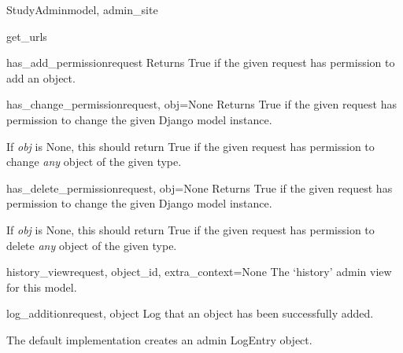 \documentclass[letterpaper,10pt,english]{sphinxmanual}
\begin{document}
\begin{classdesc}{StudyAdmin}{model, admin\_site}
\hypertarget{data.admin.StudyAdmin.get_urls}{}\begin{methoddesc}{get\_urls}{}\end{methoddesc}

\hypertarget{data.admin.StudyAdmin.has_add_permission}{}\begin{methoddesc}{has\_add\_permission}{request}
Returns True if the given request has permission to add an object.
\end{methoddesc}

\hypertarget{data.admin.StudyAdmin.has_change_permission}{}\begin{methoddesc}{has\_change\_permission}{request, obj=None}
Returns True if the given request has permission to change the given
Django model instance.

If \emph{obj} is None, this should return True if the given request has
permission to change \emph{any} object of the given type.
\end{methoddesc}

\hypertarget{data.admin.StudyAdmin.has_delete_permission}{}\begin{methoddesc}{has\_delete\_permission}{request, obj=None}
Returns True if the given request has permission to change the given
Django model instance.

If \emph{obj} is None, this should return True if the given request has
permission to delete \emph{any} object of the given type.
\end{methoddesc}

\hypertarget{data.admin.StudyAdmin.history_view}{}\begin{methoddesc}{history\_view}{request, object\_id, extra\_context=None}
The `history' admin view for this model.
\end{methoddesc}

\hypertarget{data.admin.StudyAdmin.log_addition}{}\begin{methoddesc}{log\_addition}{request, object}
Log that an object has been successfully added.

The default implementation creates an admin LogEntry object.
\end{methoddesc}


\end{classdesc}
\end{document}
